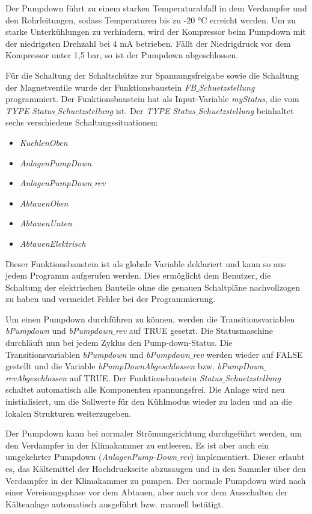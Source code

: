 Der Pumpdown führt zu einem starken Temperaturabfall in dem Verdampfer und den Rohrleitungen, sodass Temperaturen bis zu -20 °C erreicht werden. Um zu starke Unterkühlungen zu verhindern, wird der Kompressor beim Pumpdown mit der niedrigsten Drehzahl bei 4 mA betrieben. Fällt der Niedrigdruck vor dem Kompressor unter 1,5  bar, so ist der Pumpdown abgeschlossen.

Für die Schaltung der Schaltschütze zur Spannungsfreigabe sowie die Schaltung der Magnetventile wurde der Funktionsbaustein \textit{FB$\_$Schuetzstellung} programmiert. Der Funktionsbaustein hat als Input-Variable \textit{myStatus}, die vom \textit{TYPE}  \textit{Status$\_$Schuetzstellung} ist. Der \textit{TYPE}  \textit{Status$\_$Schuetzstellung} beinhaltet sechs verschiedene Schaltungssituationen:

\begin{itemize}
\item	\textit{KuehlenOben}
\item	\textit{AnlagenPumpDown}
\item	\textit{AnlagenPumpDown$\_$rev}
\item	\textit{AbtauenOben}
\item	\textit{AbtauenUnten}
\item	\textit{AbtauenElektrisch}
\end{itemize}

Dieser Funktionsbaustein ist als globale Variable deklariert und kann so aus jedem Programm aufgerufen werden. Dies ermöglicht dem Benutzer, die Schaltung der elektrischen Bauteile ohne die genauen Schaltpläne nachvollzogen zu haben und vermeidet Fehler bei der Programmierung. 

Um einen Pumpdown durchführen zu können, werden die Transitionsvariablen \textit{bPumpdown} und \textit{bPumpdown$\_$rev}  auf TRUE gesetzt. Die Statusmaschine durchläuft nun bei jedem Zyklus den Pump-down-Status. Die Transitionsvariablen \textit{bPumpdown} und \textit{bPumpdown$\_$rev} werden wieder auf FALSE gestellt und die Variable \textit{bPumpDownAbgeschlossen} bzw. \textit{bPumpDown$\_$revAbgeschlossen} auf TRUE. Der Funktionsbaustein \textit{Status$\_$Schuetzstellung} schaltet automatisch alle Komponenten spannungsfrei. Die Anlage wird neu inistialisiert, um die Sollwerte für den Kühlmodus wieder zu laden und an die lokalen Strukturen weiterzugeben. 

Der Pumpdown kann bei normaler Strömungsrichtung durchgeführt werden, um den Verdampfer in der Klimakammer zu entleeren. Es ist aber auch ein umgekehrter Pumpdown (\textit{AnlagenPump-Down$\_$rev}) implementiert. Dieser erlaubt es, das Kältemittel der Hochdruckseite abzusaugen und in den Sammler über den Verdampfer in der Klimakammer zu pumpen. Der normale Pumpdown wird nach einer Vereisungsphase vor dem Abtauen, aber auch vor dem Ausschalten der Kälteanlage automatisch ausgeführt bzw. manuell betätigt. 


